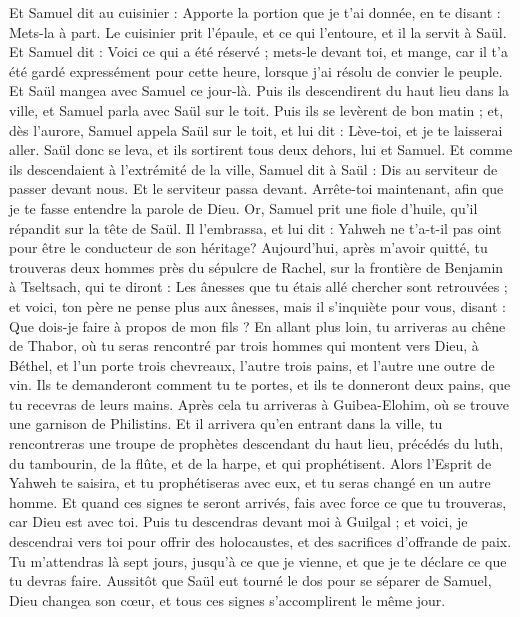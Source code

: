 \begin{multicols}{2}
Et Samuel dit au cuisinier : Apporte la portion que je t'ai donnée, en te disant : Mets-la à part.
Le cuisinier prit l’épaule, et ce qui l’entoure, et il la servit à Saül. Et Samuel dit : Voici ce qui a été réservé ; mets-le devant toi, et mange, car il t’a été gardé expressément pour cette heure, lorsque j'ai résolu de convier le peuple. Et Saül mangea avec Samuel ce jour-là.
Puis ils descendirent du haut lieu dans la ville, et Samuel parla avec Saül sur le toit.
Puis ils se levèrent de bon matin ; et, dès l’aurore, Samuel appela Saül sur le toit, et lui dit : Lève-toi, et je te laisserai aller. Saül donc se leva, et ils sortirent tous deux dehors, lui et Samuel.
Et comme ils descendaient à l’extrémité de la ville, Samuel dit à Saül : Dis au serviteur de passer devant nous. Et le serviteur passa devant. Arrête-toi maintenant, afin que je te fasse entendre la parole de Dieu.
\VerseOne{}Or, Samuel prit une fiole d'huile, qu’il répandit sur la tête de Saül. Il l’embrassa, et lui dit : Yahweh ne t'a-t-il pas oint pour être le conducteur de son héritage?
Aujourd’hui, après m’avoir quitté, tu trouveras deux hommes près du sépulcre de Rachel, sur la frontière de Benjamin à Tseltsach, qui te diront : Les ânesses que tu étais allé chercher sont retrouvées ; et voici, ton père ne pense plus aux ânesses, mais il s’inquiète pour vous, disant : Que dois-je faire à propos de mon fils ?
En allant plus loin, tu arriveras au chêne de Thabor, où tu seras rencontré par trois hommes qui montent vers Dieu, à Béthel, et l'un porte trois chevreaux, l'autre trois pains, et l'autre une outre de vin.
Ils te demanderont comment tu te portes, et ils te donneront deux pains, que tu recevras de leurs mains.
Après cela tu arriveras à Guibea-Elohim, où se trouve une garnison de Philistins. Et il arrivera qu’en entrant dans la ville, tu rencontreras une troupe de prophètes descendant du haut lieu, précédés du luth, du tambourin, de la flûte, et de la harpe, et qui prophétisent.
Alors l'Esprit de Yahweh te saisira, et tu prophétiseras avec eux, et tu seras changé en un autre homme.
Et quand ces signes te seront arrivés, fais avec force ce que tu trouveras, car Dieu est avec toi.
Puis tu descendras devant moi à Guilgal ; et voici, je descendrai vers toi pour offrir des holocaustes, et des sacrifices d’offrande de paix. Tu m'attendras là sept jours, jusqu'à ce que je vienne, et que je te déclare ce que tu devras faire.
Aussitôt que Saül eut tourné le dos pour se séparer de Samuel, Dieu changea son cœur, et tous ces signes s’accomplirent le même jour.

\end{multicols}
